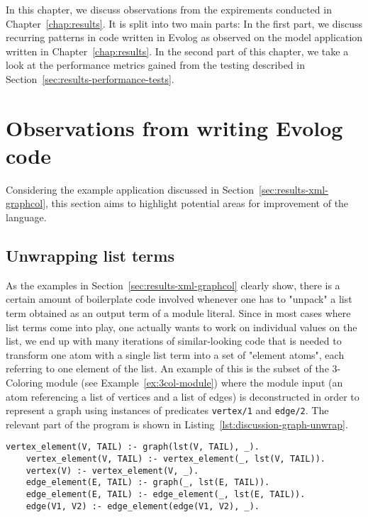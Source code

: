 In this chapter, we discuss observations from the expirements conducted in Chapter~\ref{chap:results}. It is split into two main parts: In the first part, we discuss recurring patterns in code written in Evolog as observed on the model application written in Chapter~\ref{chap:results}. In the second part of this chapter, we take a look at the performance metrics gained from the testing described in Section~\ref{sec:results-performance-tests}.

\section{Observations from writing Evolog code}

Considering the example application discussed in Section~\ref{sec:results-xml-graphcol}, this section aims to highlight potential areas for improvement of the language.

\subsection{Unwrapping list terms}
As the examples in Section~\ref{sec:results-xml-graphcol} clearly show, there is a certain amount of boilerplate code involved whenever one has to "unpack" a list term obtained as an output term of a module literal. Since in most cases where list terms come into play, one actually wants to work on individual values on the list, we end up with many iterations of similar-looking code that is needed to transform one atom with a single list term into a set of "element atoms", each referring to one element of the list. An example of this is the subset of the 3-Coloring module (see Example~\ref{ex:3col-module}) where the module input (an atom referencing a list of vertices and a list of edges) is deconstructed in order to represent a graph using instances of predicates \texttt{vertex/1} and \texttt{edge/2}. The relevant part of the program is shown in Listing~\ref{lst:discussion-graph-unwrap}.

\begin{lstlisting}[style=asp-code, label={lst:discussion-graph-unwrap}, caption={Unwrapping list terms representing a graph}]
	vertex_element(V, TAIL) :- graph(lst(V, TAIL), _).
	vertex_element(V, TAIL) :- vertex_element(_, lst(V, TAIL)).
	vertex(V) :- vertex_element(V, _).
	edge_element(E, TAIL) :- graph(_, lst(E, TAIL)).
	edge_element(E, TAIL) :- edge_element(_, lst(E, TAIL)).
	edge(V1, V2) :- edge_element(edge(V1, V2), _).
\end{lstlisting}

